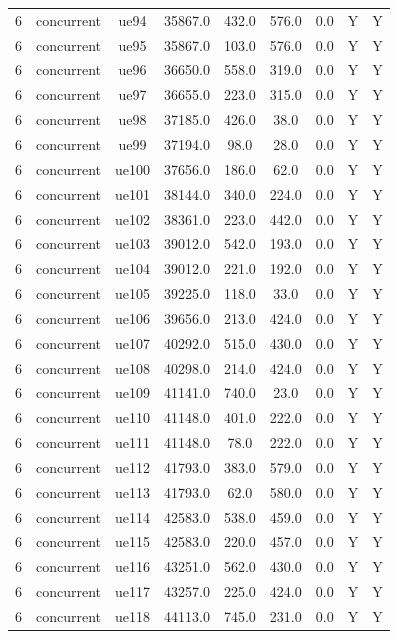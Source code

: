 \begin{table}[ht]
\begin{tabular}{|c|c|c|c|c|c|c|c|c|}
6 & concurrent & ue94 & 35867.0 & 432.0 & 576.0 & 0.0 & Y & Y \\
6 & concurrent & ue95 & 35867.0 & 103.0 & 576.0 & 0.0 & Y & Y \\
6 & concurrent & ue96 & 36650.0 & 558.0 & 319.0 & 0.0 & Y & Y \\
6 & concurrent & ue97 & 36655.0 & 223.0 & 315.0 & 0.0 & Y & Y \\
6 & concurrent & ue98 & 37185.0 & 426.0 & 38.0 & 0.0 & Y & Y \\
6 & concurrent & ue99 & 37194.0 & 98.0 & 28.0 & 0.0 & Y & Y \\
6 & concurrent & ue100 & 37656.0 & 186.0 & 62.0 & 0.0 & Y & Y \\
6 & concurrent & ue101 & 38144.0 & 340.0 & 224.0 & 0.0 & Y & Y \\
6 & concurrent & ue102 & 38361.0 & 223.0 & 442.0 & 0.0 & Y & Y \\
6 & concurrent & ue103 & 39012.0 & 542.0 & 193.0 & 0.0 & Y & Y \\
6 & concurrent & ue104 & 39012.0 & 221.0 & 192.0 & 0.0 & Y & Y \\
6 & concurrent & ue105 & 39225.0 & 118.0 & 33.0 & 0.0 & Y & Y \\
6 & concurrent & ue106 & 39656.0 & 213.0 & 424.0 & 0.0 & Y & Y \\
6 & concurrent & ue107 & 40292.0 & 515.0 & 430.0 & 0.0 & Y & Y \\
6 & concurrent & ue108 & 40298.0 & 214.0 & 424.0 & 0.0 & Y & Y \\
6 & concurrent & ue109 & 41141.0 & 740.0 & 23.0 & 0.0 & Y & Y \\
6 & concurrent & ue110 & 41148.0 & 401.0 & 222.0 & 0.0 & Y & Y \\
6 & concurrent & ue111 & 41148.0 & 78.0 & 222.0 & 0.0 & Y & Y \\
6 & concurrent & ue112 & 41793.0 & 383.0 & 579.0 & 0.0 & Y & Y \\
6 & concurrent & ue113 & 41793.0 & 62.0 & 580.0 & 0.0 & Y & Y \\
6 & concurrent & ue114 & 42583.0 & 538.0 & 459.0 & 0.0 & Y & Y \\
6 & concurrent & ue115 & 42583.0 & 220.0 & 457.0 & 0.0 & Y & Y \\
6 & concurrent & ue116 & 43251.0 & 562.0 & 430.0 & 0.0 & Y & Y \\
6 & concurrent & ue117 & 43257.0 & 225.0 & 424.0 & 0.0 & Y & Y \\
6 & concurrent & ue118 & 44113.0 & 745.0 & 231.0 & 0.0 & Y & Y \\

\end{tabular}
\end{table}
